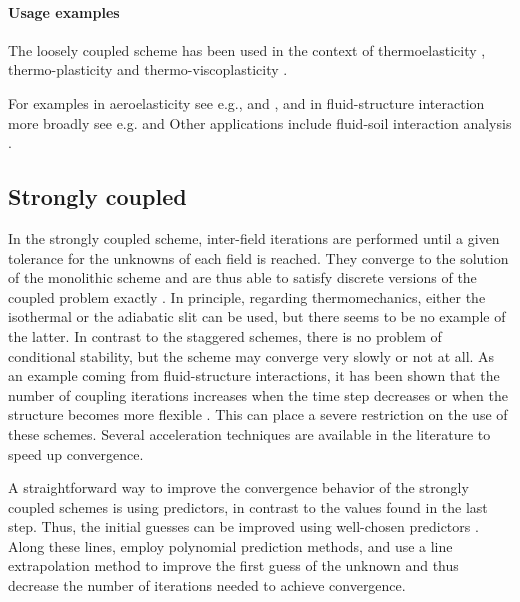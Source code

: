 \paragraph{Usage examples}

The loosely coupled scheme has been used in the context of thermoelasticity \citep{argyris_natural_1981, armero_new_1992, johansson_thermoelastic_1993, miehe_entropic_1995, miehe_theory_1995, holzapfel_entropy_1996}, thermo-plasticity \citep{armero_new_1992, armero_priori_1993, simo_associative_1992, wriggers_coupled_1992, agelet_de_saracibar_numerical_1998, agelet_de_saracibar_formulation_1999} and thermo-viscoplasticity \citep{adam_numerical_2002, adam_numerical_2002-1}.

For examples in aeroelasticity see e.g., \cite{piperno_partitioned_1995, farhat_two_2000} and \cite{farhat_application_2003}, and in fluid-structure interaction more broadly see e.g. \cite{tezduyar2006space} and \cite{miller_loosely_2015}
Other applications include fluid-soil interaction analysis \citep{saetta_unconditionally_1992, armero_formulation_1999, mikelic_convergence_2013}.


\subsection{Strongly coupled}

In the strongly coupled scheme, inter-field iterations are performed until a given tolerance for the unknowns of each field is reached.
They converge to the solution of the monolithic scheme and are thus able to satisfy discrete versions of the coupled problem exactly \citep{forster_robust_2007, danowski_computational_2014}.
In principle, regarding thermomechanics, either the isothermal or the adiabatic slit can be used, but there seems to be no example of the latter.
In contrast to the staggered schemes, there is no problem of conditional stability, but the scheme may converge very slowly or not at all.
As an example coming from fluid-structure interactions, it has been shown that the number of coupling iterations increases when the time step decreases or when the structure becomes more flexible \citep{degroote_stability_2008}.
This can place a severe restriction on the use of these schemes.
Several acceleration techniques are available in the literature to speed up convergence.

A straightforward way to improve the convergence behavior of the strongly coupled schemes is using predictors, in contrast to the values found in the last step.
Thus, the initial guesses can be improved using well-chosen predictors \cite{michler_efficient_2005}.
Along these lines, \cite{erbts_accelerated_2012} employ polynomial prediction methods, and \cite{wendt_partitioned_2015} use a line extrapolation method to improve the first guess of the unknown and thus decrease the number of iterations needed to achieve convergence.


